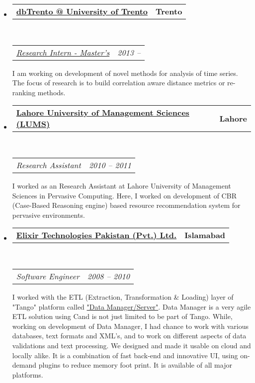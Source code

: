 \documentclass[10pt,letterpaper]{article}
\makeatletter
\newcommand{\headerrow}[2]
{\begin{tabular*}{\linewidth}{l@{\extracolsep{\fill}}r}
	#1 &
	#2 \\
\end{tabular*}}
\newcommand{\CPP}
{C\nolinebreak[4]\hspace{-.05em}\raisebox{.22ex}{\footnotesize\bf ++}}
\makeatother
\begin{document}
\begin{itemize}
	\parskip=0.1em

	\item
	\headerrow
		{\textbf{\href{http://db.disi.unitn.eu/}{dbTrento @ University of Trento}}}
		{\textbf{Trento}}
	\\
	\headerrow
		{\emph{\href{http://db.disi.unitn.eu/index.html#content=Muhammad\%20Usman\%20Akram}{Research Intern - Master's}}}
		{\emph{2013 -- }}
	\begin{itemize*}
          	I am working on development of novel methods for analysis of time series. The focus of research is to build correlation aware distance metrics or re-ranking methods.
	\end{itemize*}
	
	
	\item
	\headerrow
		{\textbf{\href{http://www.lums.edu.pk}{Lahore University of Management Sciences (LUMS)}}}
		{\textbf{Lahore}}
	\\
	\headerrow
		{\emph{Research Assistant}}
		{\emph{2010 -- 2011}}
	\begin{itemize*}
          	I worked as an Research Assistant at Lahore University of Management Sciences in Pervasive Computing. Here, I worked on development of CBR (Case-Based Reasoning engine) based resource recommendation system for pervasive environments.
	\end{itemize*}

	\item
	\headerrow
		{\textbf{\href{http://www.elixir.com}{Elixir Technologies Pakistan (Pvt.) Ltd.}}}
		{\textbf{Islamabad}}
	\\
	\headerrow
		{\emph{Software Engineer}}
		{\emph{2008 -- 2010}}
	\begin{itemize*}
		I  worked with the ETL (Extraction, Transformation \& Loading) layer of "Tango" platform called \href{http://tango.elixir.com/TangoSolutionsFramework/Data.html}{"Data Manager/Server"}. Data Manager is a very agile ETL solution using \CPP  and is not just limited to be part of Tango. While, working on development of Data Manager, I had chance to work with various databases, text formats and XML's, and to work on different aspects of data validations and text processing. We designed and made it usable on cloud and locally alike. It is a combination of fast back-end and innovative UI, using on-demand plugins to reduce memory foot print. It is available of all major platforms.
	\end{itemize*}
\end{itemize}
\end{document}
